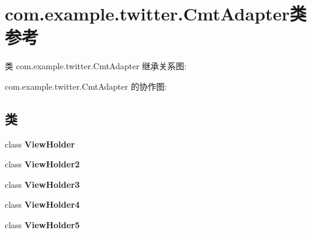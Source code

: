 \hypertarget{classcom_1_1example_1_1twitter_1_1_cmt_adapter}{}\section{com.\+example.\+twitter.\+Cmt\+Adapter类 参考}
\label{classcom_1_1example_1_1twitter_1_1_cmt_adapter}


类 com.\+example.\+twitter.\+Cmt\+Adapter 继承关系图\+:


com.\+example.\+twitter.\+Cmt\+Adapter 的协作图\+:
\subsection*{类}
\begin{DoxyCompactItemize}
\item 
class {\bfseries View\+Holder}
\item 
class {\bfseries View\+Holder2}
\item 
class {\bfseries View\+Holder3}
\item 
class {\bfseries View\+Holder4}
\item 
class {\bfseries View\+Holder5}
\end{DoxyCompactItemize}
